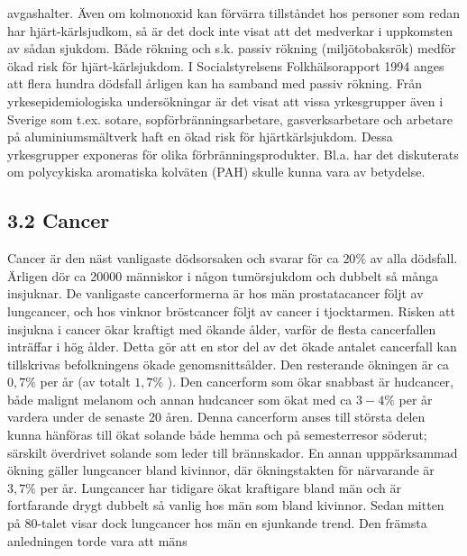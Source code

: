 avgashalter. Även om kolmonoxid kan förvärra tillståndet hos personer som redan har hjärt-kärlsjudkom, så är det dock inte visat att det medverkar i uppkomsten av sådan sjukdom.
Både rökning och s.k. passiv rökning (miljötobaksrök) medför ökad risk för hjärt-kärlsjukdom. I Socialstyrelsens Folkhälsorapport 1994 anges att flera hundra dödsfall årligen kan ha samband med passiv rökning. Från yrkesepidemiologiska undersökningar är det visat att vissa yrkesgrupper även i Sverige som t.ex. sotare, sopförbränningsarbetare, gasverksarbetare och arbetare på aluminiumsmältverk haft en ökad risk för hjärtkärlsjukdom. Dessa yrkesgrupper exponeras för olika förbränningsprodukter. Bl.a. har det diskuterats om polycykiska aromatiska kolväten (PAH) skulle kunna vara av betydelse.
\subsection*{3.2 Cancer}
Cancer är den näst vanligaste dödsorsaken och svarar för ca \(20 \%\) av alla dödsfall. Ärligen dör ca 20000 människor i någon tumörsjukdom och dubbelt så många insjuknar. De vanligaste cancerformerna är hos män prostatacancer följt av lungcancer, och hos vinknor bröstcancer följt av cancer i tjocktarmen. Risken att insjukna i cancer ökar kraftigt med ökande ålder, varför de flesta cancerfallen inträffar i hög ålder. Detta gör att en stor del av det ökade antalet cancerfall kan tillskrivas befolkningens ökade genomsnittsålder. Den resterande ökningen är ca \(0,7 \%\) per år (av totalt \(1,7 \%\) ).
Den cancerform som ökar snabbast är hudcancer, både malignt melanom och annan hudcancer som ökat med ca \(3-4 \%\) per år vardera under de senaste 20 åren. Denna cancerform anses till största delen kunna hänföras till ökat solande både hemma och på semesterresor söderut; särskilt överdrivet solande som leder till brännskador.
En annan upppärksammad ökning gäller lungcancer bland kivinnor, där ökningstakten för närvarande är \(3,7 \%\) per år. Lungcancer har tidigare ökat kraftigare bland män och är fortfarande drygt dubbelt så vanlig hos män som bland kivinnor. Sedan mitten på 80-talet visar dock lungcancer hos män en sjunkande trend. Den främsta anledningen torde vara att mäns


